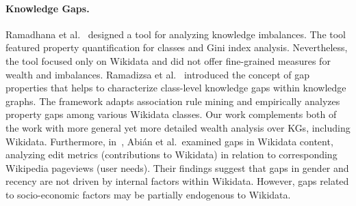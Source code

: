 \paragraph{Knowledge Gaps.} Ramadhana et al.~\cite{RamadhanaDPNRA20} designed a tool for analyzing knowledge imbalances. The tool featured property quantification for classes and Gini index analysis. Nevertheless, the tool focused only on Wikidata and did not offer fine-grained measures for wealth and imbalances.
Ramadizsa et al.~\cite{RamadizsaDNR23} introduced the concept of gap properties that helps to characterize class-level knowledge gaps within knowledge graphs. The framework adapts association rule mining and empirically analyzes property gaps among various Wikidata classes.
Our work complements both of the work with more general yet more detailed wealth analysis over KGs, including Wikidata. Furthermore, in~\cite{AbianMS22}, Abi{\'{a}}n et al.\ examined gaps in Wikidata content, analyzing edit metrics (contributions to Wikidata) in relation to corresponding Wikipedia pageviews (user needs). Their findings suggest that gaps in gender and recency are not driven by internal factors within Wikidata. However, gaps related to socio-economic factors may be partially endogenous to Wikidata.